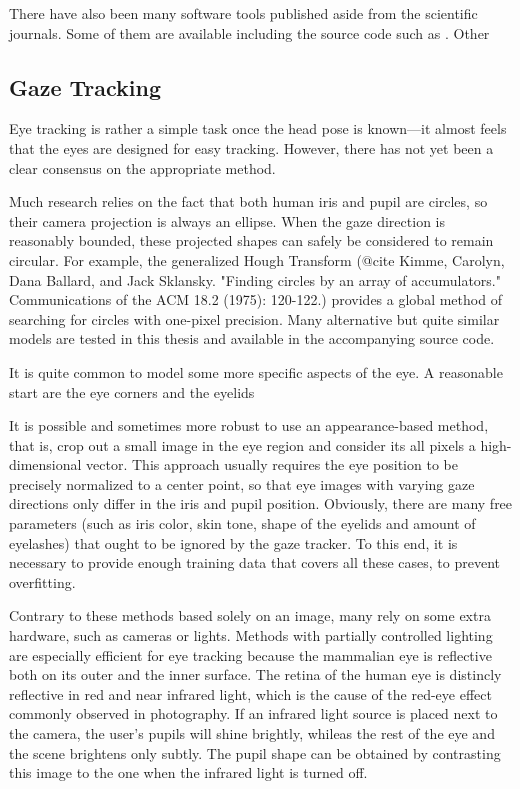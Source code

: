 There have also been many software tools published aside from the scientific journals.
Some of them are available including the source code such as \cite{p:pupil} \todo{\dots}.
Other 

\subsection{Gaze Tracking}
Eye tracking is rather a simple task once the head pose is known---it almost feels that the eyes are designed for easy tracking.
However, there has not yet been a clear consensus on the appropriate method.

Much research relies on the fact that both human iris and pupil are circles, so their camera projection is always an ellipse.
When the gaze direction is reasonably bounded, these projected shapes can safely be considered to remain circular.
For example, the generalized Hough Transform (@cite Kimme, Carolyn, Dana Ballard, and Jack Sklansky. "Finding circles by an array of accumulators." Communications of the ACM 18.2 (1975): 120-122.) provides a global method of searching for circles with one-pixel precision.
Many alternative but quite similar models are tested in this thesis and available in the accompanying source code.

It is quite common to model some more specific aspects of the eye.
A reasonable start are the eye corners\cite{b:zhu12} and the eyelids 

It is possible and sometimes more robust to use an appearance-based method, that is, crop out a small image in the eye region and consider its all pixels a high-dimensional vector.
This approach usually requires the eye position to be precisely normalized to a center point, so that eye images with varying gaze directions only differ in the iris and pupil position.
Obviously, there are many free parameters (such as iris color, skin tone, shape of the eyelids and amount of eyelashes) that ought to be ignored by the gaze tracker.
To this end, it is necessary to provide enough training data that covers all these cases, to prevent overfitting.

Contrary to these methods based solely on an image, many rely on some extra hardware, such as cameras or lights.
Methods with partially controlled lighting are especially efficient for eye tracking because the mammalian eye is reflective both on its outer and the inner surface.
The retina of the human eye is distincly reflective in red and near infrared light, which is the cause of the red-eye effect commonly observed in photography.
If an infrared light source is placed next to the camera, the user's pupils will shine brightly, whileas the rest of the eye and the scene brightens only subtly.
The pupil shape can be obtained by contrasting this image to the one when the infrared light is turned off.

